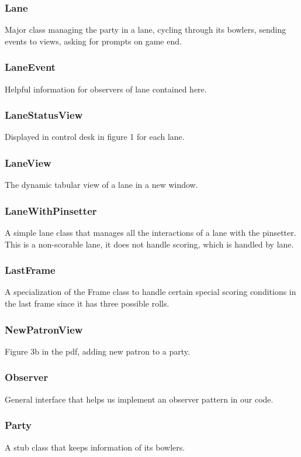 \subsubsection{Lane}
Major class managing the party in a lane, cycling through its bowlers, sending events to views, asking for prompts on game end.

\subsubsection{LaneEvent}
Helpful information for observers of lane contained here.

\subsubsection{LaneStatusView}
Displayed in control desk in figure 1 for each lane.

\subsubsection{LaneView}
The dynamic tabular view of a lane in a new window.

\subsubsection{LaneWithPinsetter}
A simple lane class that manages all the interactions of a lane with the pinsetter. This is a non-scorable lane, it does not handle scoring, which is handled by lane.

\subsubsection{LastFrame}
A specialization of the Frame class to handle certain special scoring conditions in the last frame since it has three possible rolls.

\subsubsection{NewPatronView}
Figure 3b in the pdf, adding new patron to a party.

\subsubsection{Observer}
General interface that helps us implement an observer pattern in our code.

\subsubsection{Party}
A stub class that keeps information of its bowlers.

